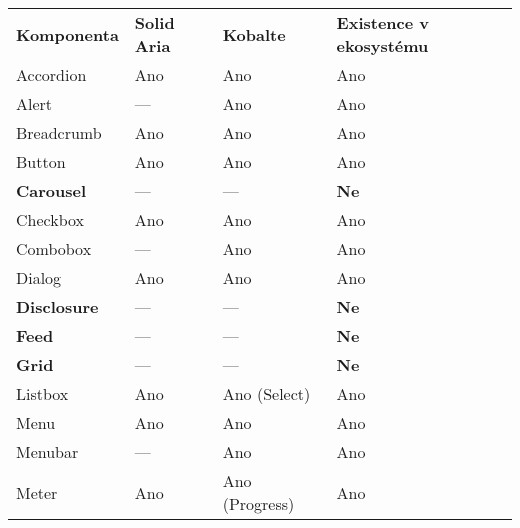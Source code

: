 \begin{table}[ht]
    \begin{tabularx}{\textwidth}{Y Y Y Y}
        \bfseries{Komponenta} & \bfseries{Solid Aria} & \bfseries{Kobalte} & \bfseries{Existence v ekosystému} \\\Midrule{}
        Accordion             & Ano                   & Ano                & Ano                               \\
        Alert                 & ---                   & Ano                & Ano                               \\
        Breadcrumb            & Ano                   & Ano                & Ano                               \\
        Button                & Ano                   & Ano                & Ano                               \\
        \textbf{Carousel}     & ---                   & ---                & \textbf{Ne}                       \\
        Checkbox              & Ano                   & Ano                & Ano                               \\
        Combobox              & ---                   & Ano                & Ano                               \\
        Dialog                & Ano                   & Ano                & Ano                               \\
        \textbf{Disclosure}   & ---                   & ---                & \textbf{Ne}                       \\
        \textbf{Feed}         & ---                   & ---                & \textbf{Ne}                       \\
        \textbf{Grid}         & ---                   & ---                & \textbf{Ne}                       \\
        Listbox               & Ano                   & Ano (Select)       & Ano                               \\
        Menu                  & Ano                   & Ano                & Ano                               \\
        Menubar               & ---                   & Ano                & Ano                               \\
        Meter                 & Ano                   & Ano (Progress)     & Ano                               \\

\end{tabularx}
\end{table}
